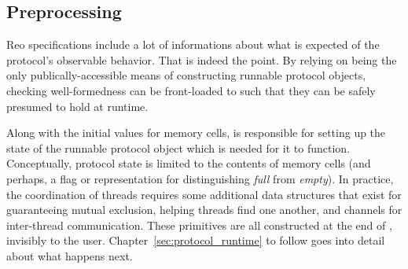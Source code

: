 \subsection{Preprocessing}
Reo specifications include a lot of informations about what is expected of the protocol's observable behavior. That is indeed the point. By relying on  being the only publically-accessible means of constructing runnable protocol objects, checking well-formedness can be front-loaded to  such that they can be safely presumed to hold at runtime. 

Along with the initial values for memory cells,  is responsible for setting up the state of the runnable protocol object which is needed for it to function. Conceptually, protocol state is limited to the contents of memory cells (and perhaps, a flag or  representation for distinguishing \textit{full} from \textit{empty}). In practice, the coordination of threads requires some additional data structures that exist for guaranteeing mutual exclusion, helping threads find one another, and channels for inter-thread communication. These primitives are all constructed at the end of , invisibly to the user. Chapter~\ref{sec:protocol_runtime} to follow goes into detail about what happens next.

